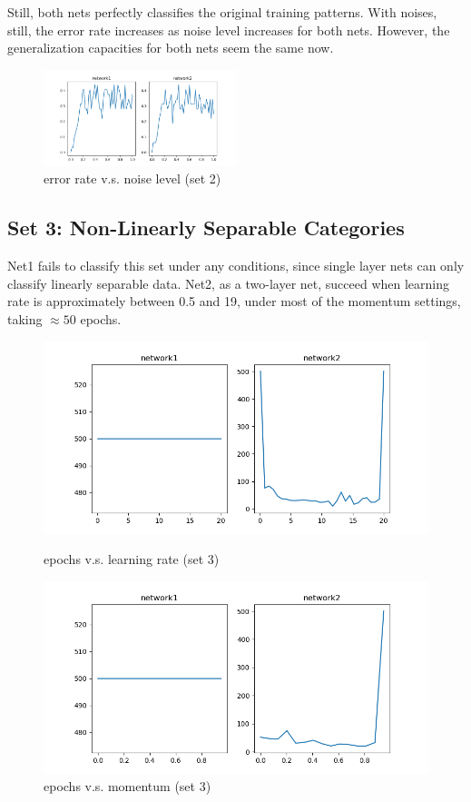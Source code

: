 \documentclass{article}
\begin{document}
Still, both nets perfectly classifies the original training patterns. With noises, still, the error rate increases as noise level increases for both nets. However, the generalization capacities for both nets seem the same now.
\begin{figure}[!ht]
    \centering
    \includegraphics[width=0.5\textwidth]{part1set2g.png}
    \caption{error rate v.s. noise level (set 2)}
\end{figure}

\subsection*{Set 3: Non-Linearly Separable Categories}
Net1 fails to classify this set under any conditions, since single layer nets can only classify linearly separable data. Net2, as a two-layer net, succeed when learning rate is approximately between 0.5 and 19, under most of the momentum settings, taking $\approx50$ epochs.
\begin{figure}[!ht]
    \begin{minipage}{0.5\textwidth}
        \centering
        \includegraphics[width=\linewidth]{part1set3.png} 
        \caption{epochs v.s. learning rate (set 3)}   
    \end{minipage}\hfill
    \begin{minipage}{0.5\textwidth}
        \centering
        \includegraphics[width=\linewidth]{part1set3m.png}    
        \caption{epochs v.s. momentum (set 3)}
    \end{minipage}
\end{figure}
\end{document}
